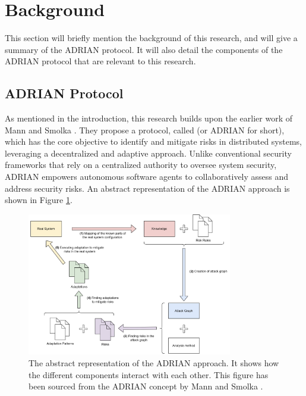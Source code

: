 \section{Background}
\label{sec:background}
This section will briefly mention the background of this research, and will give a summary of the ADRIAN protocol. It will also detail the components of the ADRIAN protocol that are relevant to this research.

\subsection{ADRIAN Protocol}
\label{ssec:adrian}

As mentioned in the introduction, this research builds upon the earlier work of Mann and Smolka \cite{mann2023ADRIAN}. They propose a protocol, called \ADRIAN (or ADRIAN for short), which has the core objective to identify and mitigate risks in distributed systems, leveraging a decentralized and adaptive approach. Unlike conventional security frameworks that rely on a centralized authority to oversee system security, ADRIAN empowers autonomous software agents to collaboratively assess and address security risks. An abstract representation of the ADRIAN approach is shown in Figure \ref{fig:adrian-architecture}.

\begin{figure}
    \centering
    \includegraphics[width=0.8\textwidth]{content/adrian-architecture.png}
    \caption{The abstract representation of the ADRIAN approach. It shows how the different components interact with each other. This figure has been sourced from the ADRIAN concept by Mann and Smolka \cite{mann2023ADRIAN}.}
    \label{fig:adrian-architecture}
\end{figure}

